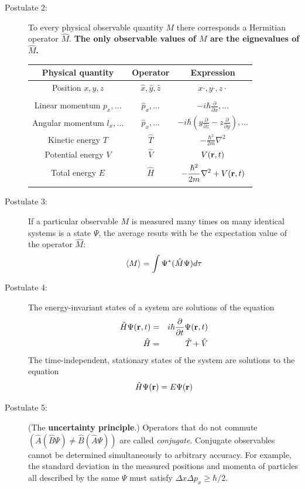 \documentclass[11pt]{article}
\begin{document}
\begin{table}
\begin{center}
\begin{description}
  \item[Postulate 2:]  To every physical observable quantity $M$ there corresponds a
    Hermitian operator $\hat{M}$.  {\bf The only observable values of $M$ are the
      eignevalues of $\hat{M}$.}
    \begin{center}
    \begin{tabular}[h]{ccc}
      \hline
{\bf Physical quantity} & {\bf Operator} & {\bf Expression} \\
\hline
Position $x,y,z$ & $\hat{x},\hat{y},\hat{z}$ & $x\cdot, y\cdot, z\cdot$ \\ \\
Linear momentum $p_x, \ldots$ & $\hat{p}_x,\ldots $ & $\displaystyle -i\hbar\frac{\partial}{\partial
  x},\ldots $\\
Angular momentum $l_x, \ldots$ & $\hat{p}_x,\ldots $ & $\displaystyle -i\hbar \left
  (y\frac{\partial}{\partial z}-z\frac{\partial}{\partial y}\right ), \ldots $ \\
Kinetic energy $T$ & $\hat{T}$ & $\displaystyle -\frac{\hbar^2}{2m}\nabla^2$ \\
Potential energy $V$ & $\hat{V}$ & $V({\bf r},t)$ \\
Total energy $E$ & $\hat{H}$ & $\displaystyle -\frac{\hbar^2}{2m}\nabla^2+V({\bf r},t)$\\ \\
\hline
    \end{tabular}
  \end{center}
    \item[Postulate 3:] {If a particular observable $M$ is measured many times on many
      identical systems is a state $\Psi$, the average resuts with be the expectation
      value of the operator $\hat{M}$:
      \begin{equation*}
        \langle M \rangle = \int \Psi^* (\hat{M}\Psi)d{\bf\tau}
      \end{equation*}}
    \item[Postulate 4:] {The energy-invariant states of a system are solutions of the equation
        \begin{eqnarray*}
          \hat{H}\Psi({\bf r},t) & = & i\hbar\frac{\partial}{\partial t}\Psi({\bf r},t) \\
          \hat{H} & = & \hat{T}+\hat{V}
        \end{eqnarray*}
      The time-independent, stationary states of the system are solutions to the equation
      \begin{equation*}
        \hat{H}\Psi({\bf r}) = E\Psi(\bf{r})
      \end{equation*}
}
    \item[Postulate 5:] (The {\bf uncertainty principle}.)  Operators that do not commute
      $(\hat{A}(\hat{B}\Psi)\neq\hat{B}(\hat{A}\Psi))$ are called {\em conjugate}.
      Conjugate observables cannot be determined simultaneously to arbitrary accuracy.
      For example, the standard deviation in the measured positions and momenta of
      particles all described by the same $\Psi$ must satisfy $\Delta x\Delta p_x \geq \hbar/2$.
    \end{description}
\end{center}
\end{table}
\end{document}
